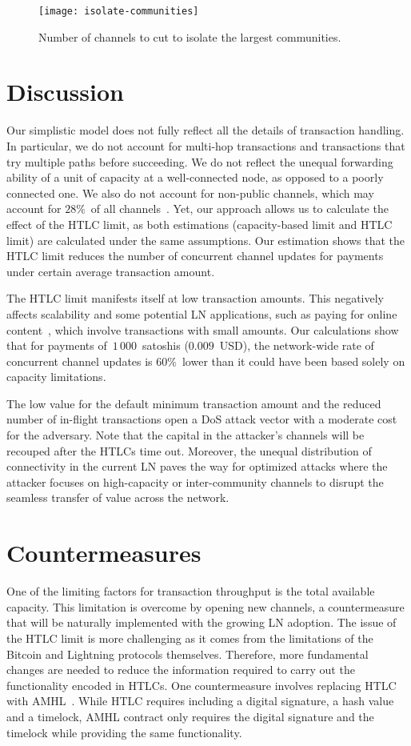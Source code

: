 \begin{figure}[tb]
	\centering
	\texttt{[image: isolate-communities]}
	\caption{Number of channels to cut to isolate the largest communities.}
	\label{fig:isolate-communities}
\end{figure}


\section{Discussion}
Our simplistic model does not fully reflect all the details of transaction handling.
In particular, we do not account for multi-hop transactions and transactions that try multiple paths before succeeding.
We do not reflect the unequal forwarding ability of a unit of capacity at a well-connected node, as opposed to a poorly connected one.
We also do not account for non-public channels, which may account for $28\%$~of all channels~\cite{BitMEXPrivateChannels}.
Yet, our approach allows us to calculate the effect of the HTLC limit, as both estimations (capacity-based limit and HTLC limit) are calculated under the same assumptions.
Our estimation shows that the HTLC limit reduces the number of concurrent channel updates for payments under certain average transaction amount.

The HTLC limit manifests itself at low transaction amounts.
This negatively affects scalability and some potential LN applications, such as paying for online content~\cite{Poon2016}, which involve transactions with small amounts. 
Our calculations show that for payments of~$1\,000$~satoshis ($0.009$~USD), the network-wide rate of concurrent channel updates is $60\%$~lower than it could have been based solely on capacity limitations.

The low value for the default minimum transaction amount and the reduced number of in-flight transactions open a DoS attack vector with a moderate cost for the adversary.
Note that the capital in the attacker's channels will be recouped after the HTLCs time out.
Moreover, the unequal distribution of connectivity in the current LN paves the way for optimized attacks where the attacker focuses on high-capacity or inter-community channels to disrupt the seamless transfer of value across the network.


\section{Countermeasures}
One of the limiting factors for transaction throughput is the total available capacity.
This limitation is overcome by opening new channels, a countermeasure that will be naturally implemented with the growing LN adoption.
The issue of the HTLC limit is more challenging as it comes from the limitations of the Bitcoin and Lightning protocols themselves.
Therefore, more fundamental changes are needed to reduce the information required to carry out the functionality encoded in HTLCs.
One countermeasure involves replacing HTLC with AMHL~\cite{Malavolta2019}.
While HTLC requires including a digital signature, a hash value and a timelock, AMHL contract only requires the digital signature and the timelock while providing the same functionality.

